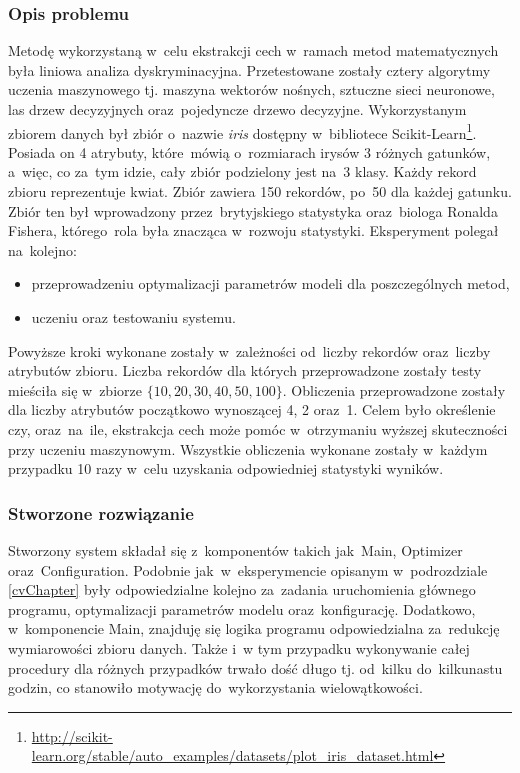 \subsubsection{Opis problemu}
Metodę wykorzystaną w~celu ekstrakcji cech w~ramach metod matematycznych była liniowa analiza dyskryminacyjna. Przetestowane zostały cztery algorytmy uczenia maszynowego tj. maszyna wektorów nośnych, sztuczne sieci neuronowe, las drzew decyzyjnych oraz~pojedyncze drzewo decyzyjne. Wykorzystanym zbiorem danych był zbiór o~nazwie \textit{iris} dostępny w~bibliotece Scikit-Learn\footnote{\url{http://scikit-learn.org/stable/auto_examples/datasets/plot_iris_dataset.html}}. Posiada on 4 atrybuty, które~mówią o~rozmiarach irysów 3 różnych gatunków, a~więc, co za~tym idzie, cały zbiór podzielony jest na~3 klasy. Każdy rekord zbioru reprezentuje kwiat. Zbiór zawiera 150 rekordów, po~50 dla każdej gatunku. Zbiór ten był wprowadzony przez~brytyjskiego statystyka oraz~biologa Ronalda Fishera, którego~rola była znacząca w~rozwoju statystyki. Eksperyment polegał na~kolejno:
\begin{itemize}

\item przeprowadzeniu optymalizacji parametrów modeli dla poszczególnych metod,
\item uczeniu oraz testowaniu systemu.

\end{itemize}

Powyższe kroki wykonane zostały w~zależności od~liczby rekordów oraz~liczby atrybutów zbioru. Liczba rekordów dla których przeprowadzone zostały testy mieściła się w~zbiorze $ \{10, 20, 30, 40, 50, 100\} $. Obliczenia przeprowadzone zostały dla liczby atrybutów początkowo wynoszącej 4, 2 oraz~1. Celem było określenie czy, oraz~na~ile, ekstrakcja cech może pomóc w~otrzymaniu wyższej skuteczności przy uczeniu maszynowym. Wszystkie obliczenia wykonane zostały w~każdym przypadku 10 razy w~celu uzyskania odpowiedniej statystyki wyników.

\subsubsection{Stworzone rozwiązanie}
Stworzony system składał się z~komponentów takich jak~Main, Optimizer oraz~Configuration. Podobnie jak~w~eksperymencie opisanym w~podrozdziale \ref{cvChapter} były odpowiedzialne kolejno za~zadania uruchomienia głównego programu, optymalizacji parametrów modelu oraz~konfigurację. Dodatkowo, w~komponencie Main, znajduję się logika programu odpowiedzialna za~redukcję wymiarowości zbioru danych. Także i~w tym przypadku wykonywanie całej procedury dla różnych przypadków trwało dość długo tj. od~kilku do~kilkunastu godzin, co stanowiło motywację do~wykorzystania wielowątkowości.

